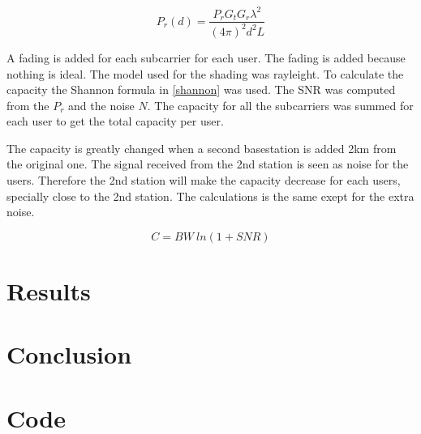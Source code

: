 \documentclass[twocolumn]{article}
\begin{document}
\begin{equation}
\label{power}
P_r(d)=\frac{P_rG_tG_r\lambda^2}{(4\pi)^2d^2L}
\end{equation}

A fading is added for each subcarrier for each user. The fading is added because nothing is ideal. The model used for the shading was rayleight.
To calculate the capacity the Shannon formula in \eqref{shannon} was used. The SNR was computed from the $P_r$ and the noise $N$.
The capacity for all the subcarriers was summed for each user to get the total capacity per user.

The capacity is greatly changed when a second basestation is added 2km from the original one.
The signal received from the 2nd station is seen as noise for the users.
Therefore the 2nd station will make the capacity decrease for each users, specially close to the 2nd station.
The calculations is the same exept for the extra noise.

\begin{equation}
\label{shannon}
C=BW~ln(1+SNR)
\end{equation}

\section{Results}




\section{Conclusion}



\onecolumn
\appendix
\section{Code}

\end{document}
